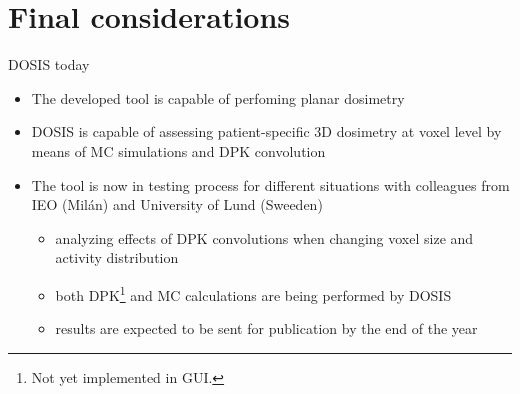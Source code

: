 \documentclass[ignorenonframetext,]{beamer}
\providecommand{\tightlist}{%
  \setlength{\itemsep}{0pt}\setlength{\parskip}{0pt}}
\begin{document}
\hypertarget{final-considerations}{%
\section{Final considerations}\label{final-considerations}}

\begin{frame}{DOSIS today}
\protect\hypertarget{dosis-today}{}

\begin{itemize}
\item
  The developed tool is capable of perfoming planar dosimetry
\item
  DOSIS is capable of assessing patient-specific 3D dosimetry at voxel
  level by means of MC simulations and DPK convolution
\item
  The tool is now in testing process for different situations with
  colleagues from IEO (Milán) and University of Lund (Sweeden)

  \begin{itemize}
  \tightlist
  \item
    analyzing effects of DPK convolutions when changing voxel size and
    activity distribution
  \item
    both DPK\footnote{Not yet implemented in GUI.} and MC calculations
    are being performed by DOSIS
  \item
    results are expected to be sent for publication by the end of the
    year
  \end{itemize}
\end{itemize}

\end{frame}
\end{document}

